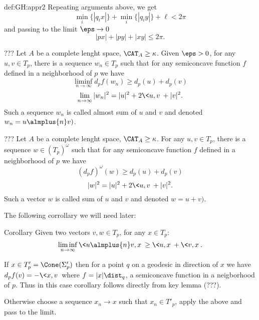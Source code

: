 {\begin{subthm}{def:GH:appr2}
Repeating arguments above, we get 
$$\min_i\{|q_ix|\}+\min_i\{|q_iy|\}+\ell< 2\pi$$
and passing to the limit $\eps\to0$
$$|px|+|py|+|xy|\le 2\pi.$$



















\begin{thm}{???}
Let $A$ be a complete lenght space, $\CAT_A\ge\kappa$.
Given $\eps>0$, for any $u,v\in T_p$, there is a sequence $w_n\in T_p$ such that for any semiconcave function $f$ defined in a neighborhood of $p$ we have
$$\liminf_{n\to\infty} d_p f(w_n)\ge d_p(u)+d_p(v)$$
$$\lim_{n\to\infty}|w_n|^2= |u|^2+2\<u,v\> +|v|^2.$$
Such a sequence $w_n$ is called almost sum of $u$ and $v$ and denoted $w_n=u\almplus{n} v)$.
\end{thm}

\begin{thm}{???}
Let $A$ be a complete lenght space, $\CAT_A\ge\kappa$.
For any $u,v\in T_p$, there is a sequence $w\in (T_p)^\omega$ such that for any semiconcave function $f$ defined in a neighborhood of $p$ we have
$$(d_p f)^\omega(w)\ge d_p(u)+d_p(v)$$
$$|w|^2= |u|^2+2\<u,v\> +|v|^2.$$
Such a vector $w$ is called sum of $u$ and $v$ and denoted $w=u+v)$.
\end{thm}








The following corrollary we will need later:

\begin{thm}{Corollary}
Given two vectors $v,w\in T_p$, for any $x\in T_p$:
$$\liminf_{n\to\infty}\<u\almplus{n} v,x\>\ge\<u,x\>+\<v,x\>.$$
\end{thm}

If $x\in T'_p=\Cone(\Sigma'_p)$ then for a point $q$ on a geodesic in direction of $x$ we have $d_pf(v)=-\<x,v\>$ where $f=|x|\dist_q$, a semiconcave function in a neigborhood of $p$.
Thus in this case corollary follows directly from key lemma (???).

Otherwise choose a sequence $x_n\to x$ such that $x_n\in T'_p$, apply the above and pass to the limit.
\qeds











\end{subthm}}
